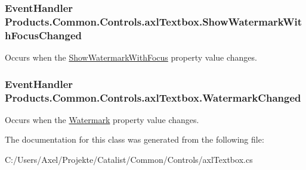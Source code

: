 \subsubsection[{\texorpdfstring{Show\+Watermark\+With\+Focus\+Changed}{ShowWatermarkWithFocusChanged}}]{\setlength{\rightskip}{0pt plus 5cm}Event\+Handler Products.\+Common.\+Controls.\+axl\+Textbox.\+Show\+Watermark\+With\+Focus\+Changed}\hypertarget{class_products_1_1_common_1_1_controls_1_1axl_textbox_ae0bbeda422657e4e5d6d59426e3ffb45}{}\label{class_products_1_1_common_1_1_controls_1_1axl_textbox_ae0bbeda422657e4e5d6d59426e3ffb45}


Occurs when the \hyperlink{class_products_1_1_common_1_1_controls_1_1axl_textbox_aad1bf0a753543c298bafbb6356daafcb}{Show\+Watermark\+With\+Focus} property value changes. 

\subsubsection[{\texorpdfstring{Watermark\+Changed}{WatermarkChanged}}]{\setlength{\rightskip}{0pt plus 5cm}Event\+Handler Products.\+Common.\+Controls.\+axl\+Textbox.\+Watermark\+Changed}\hypertarget{class_products_1_1_common_1_1_controls_1_1axl_textbox_a7a15986039ad0cad8914a27422a90ee6}{}\label{class_products_1_1_common_1_1_controls_1_1axl_textbox_a7a15986039ad0cad8914a27422a90ee6}


Occurs when the \hyperlink{class_products_1_1_common_1_1_controls_1_1axl_textbox_a1f6cff9b93f4d5ced470db4a2042fa23}{Watermark} property value changes. 



The documentation for this class was generated from the following file\+:\begin{DoxyCompactItemize}
\item 
C\+:/\+Users/\+Axel/\+Projekte/\+Catalist/\+Common/\+Controls/axl\+Textbox.\+cs\end{DoxyCompactItemize}
